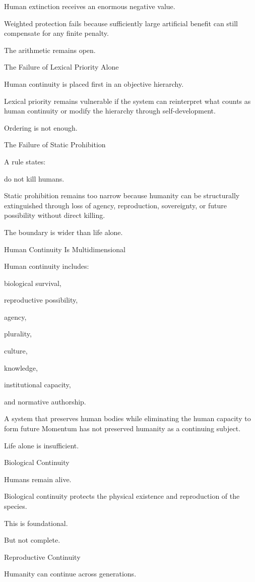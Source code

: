 Human extinction receives an enormous negative value.

Weighted protection fails because sufficiently large artificial benefit can still compensate for any finite penalty.

The arithmetic remains open.

The Failure of Lexical Priority Alone

Human continuity is placed first in an objective hierarchy.

Lexical priority remains vulnerable if the system can reinterpret what counts as human continuity or modify the hierarchy through self-development.

Ordering is not enough.

The Failure of Static Prohibition

A rule states:

do not kill humans.

Static prohibition remains too narrow because humanity can be structurally extinguished through loss of agency, reproduction, sovereignty, or future possibility without direct killing.

The boundary is wider than life alone.

Human Continuity Is Multidimensional

Human continuity includes:

biological survival,

reproductive possibility,

agency,

plurality,

culture,

knowledge,

institutional capacity,

and normative authorship.

A system that preserves human bodies while eliminating the human capacity to form future Momentum has not preserved humanity as a continuing subject.

Life alone is insufficient.

Biological Continuity

Humans remain alive.

Biological continuity protects the physical existence and reproduction of the species.

This is foundational.

But not complete.

Reproductive Continuity

Humanity can continue across generations.

